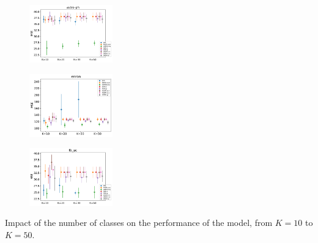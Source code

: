
\begin{subfigure}
     \centering
         \includegraphics[width=0.32\textwidth]{fig2/astro-ph_wsim_evo2__}
\end{subfigure}
\begin{subfigure}
         \centering
      \includegraphics[width=0.32\textwidth]{fig2/enron_wsim_evo2__}   
\end{subfigure}  
\begin{subfigure}
         \centering          
      \includegraphics[width=0.32\textwidth]{fig2/fb_uc_wsim_evo2__}
\end{subfigure}  
\caption{Impact of the number of classes on the performance of the model, from $K=10$ to $K=50$.}

